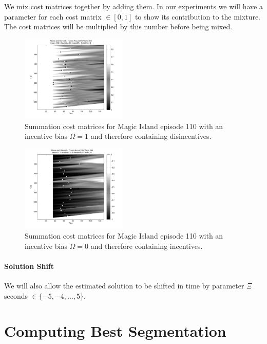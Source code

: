\documentclass[twocolumn]{article}
\begin{document}
	We mix cost matrices together by adding them. In our experiments we will have a parameter for each cost matrix $\in [0,1]$ to show its contribution to the mixture. The cost matrices will be multiplied by this number before being mixed. 
	
		\begin{figure}
			\centering
			\includegraphics[width=0.45\textwidth]{images/cmsumib0}
			\caption{Summation cost matrices for Magic Island episode 110 with an incentive bias $\Omega=1$ and therefore containing disincentives. }
			\label{fig:cmsumib1}
		\end{figure} 
		
		\begin{figure}
			\centering
			\includegraphics[width=0.45\textwidth]{images/cmsumib1}
			\caption{Summation cost matrices for Magic Island episode 110 with an incentive bias $\Omega=0$ and therefore containing incentives. }
			\label{fig:cmsumib2}
		\end{figure} 
		
		
	\paragraph{Solution Shift}
	
	We will also allow the estimated solution to be shifted in time by parameter $\varXi$ seconds $\in \{-5,-4,\ldots,5\}$.
	
	\section{Computing Best Segmentation}\label{best_cost}
	
\end{document}
